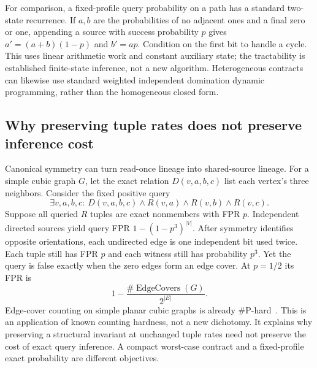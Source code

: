 \documentclass[../main.tex]{subfiles}
\begin{document}
For comparison, a fixed-profile query probability on a path has a standard
two-state recurrence. If $a,b$ are the probabilities of no adjacent ones
and a final zero or one, appending a source with success probability $p$
gives $a'=(a+b)(1-p)$ and $b'=ap$. Condition on the first bit to handle a
cycle. This uses linear arithmetic work and constant auxiliary state;
the tractability is established finite-state inference, not a new algorithm.
Heterogeneous contracts can likewise use standard weighted independent
domination dynamic programming, rather than the homogeneous closed form.

\subsection{Why preserving tuple rates does not preserve inference cost}
Canonical symmetry can turn read-once lineage into shared-source lineage.
For a simple cubic graph $G$, let the exact relation $D(v,a,b,c)$ list each
vertex's three neighbors. Consider the fixed positive query
\[
 \exists v,a,b,c:\ D(v,a,b,c)\land R(v,a)\land R(v,b)\land R(v,c).
\]
Suppose all queried $R$ tuples are exact nonmembers with FPR $p$.
Independent directed sources yield query FPR $1-(1-p^3)^{|V|}$.
After symmetry identifies opposite orientations, each undirected edge is
one independent bit used twice. Each tuple still has FPR $p$ and each
witness still has probability $p^3$. Yet the query is false exactly when
the zero edges form an edge cover. At $p=1/2$ its FPR is
\[
 1-\frac{\#\operatorname{EdgeCovers}(G)}{2^{|E|}}.
\]
Edge-cover counting on simple planar cubic graphs is already
\#P-hard~\cite{cai2012holographic,amarilli2022matchings}.
This is an application of known counting hardness, not a new dichotomy.
It explains why preserving a structural invariant at unchanged tuple rates
need not preserve the cost of exact query inference. A compact worst-case
contract and a fixed-profile exact probability are different objectives.
\end{document}

